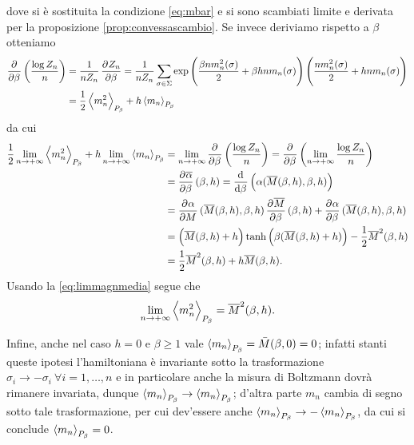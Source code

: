 dove si è sostituita la condizione \eqref{eq:mbar} e si sono scambiati limite e derivata per la proposizione \ref{prop:convessascambio}. Se invece deriviamo rispetto a $ \beta $ otteniamo
\begin{align*}
    \dpd{}{\beta} \left(\frac{\log Z_n}{n}\right) &= \frac{1}{n Z_n} \dpd{Z_n}{\beta} = \frac{1}{n Z_n} \sum_{\sigma \in \Sigma} \exp\left( \frac{\beta n m_n^2(\sigma)}{2} + \beta h n m_n(\sigma) \right) \left( \frac{n m_n^2(\sigma)}{2} + hnm_n(\sigma) \right) \\ &= \frac{1}{2} \mean{m_n^2}_{P_\beta} + h \mean{m_n}_{P_\beta}
\end{align*}
da cui
\begin{align*}
	\frac{1}{2}\lim_{n \to +\infty}\mean{m_n^2}_{P_\beta} + h\lim_{n \to +\infty}\mean{m_n}_{P_\beta}& = \lim_{n \to +\infty} \dpd{}{\beta} \left(\frac{\log Z_n}{n}\right) = \dpd{}{\beta} \left( \lim_{n \to +\infty}\frac{\log Z_n}{n} \right) \\
                                               & = \dpd{\overline{\alpha}}{\beta}(\beta,h) = \dod{}{\beta}\left(\alpha(\overline{M}(\beta,h),\beta,h)\right) \\
                                               & = \dpd{\alpha}{M}(\overline{M}(\beta,h),\beta,h) \dpd{\overline{M}}{\beta}(\beta,h) + \dpd{\alpha}{\beta}(\overline{M}(\beta,h),\beta,h) \\
                                               & = \left(\overline{M}(\beta,h) + h\right) \tanh\left(\beta(\overline{M}(\beta,h)+ h)\right) - \frac{1}{2}\overline{M}^2(\beta,h)\\
                                               & = \frac{1}{2}\overline{M}^2(\beta,h) + h \overline{M}(\beta,h).
\end{align*}
Usando la \ref{eq:limmagnmedia} segue che
\[ \lim_{n \to +\infty} \left< m_n^2 \right>_{P_\beta} = \overline{M}^2(\beta,h). \]

Infine, anche nel caso $ h=0 $ e $ \beta \geq 1 $ vale $ \left< m_n \right>_{P_\beta} = \bar{M}(\beta,0) = 0$; infatti stanti queste ipotesi l'hamiltoniana è invariante sotto la trasformazione $ \sigma_i \to -\sigma_i \ \forall i = 1,\ldots,n$ e in particolare anche la misura di Boltzmann dovrà rimanere invariata, dunque $ \left< m_n \right>_{P_\beta} \to \left< m_n \right>_{P_\beta} $; d'altra parte $ m_n $ cambia di segno sotto tale trasformazione, per cui dev'essere anche $ \left< m_n \right>_{P_\beta} \to -\left< m_n \right>_{P_\beta} $, da cui si conclude $ \left< m_n \right>_{P_\beta} = 0 $.
